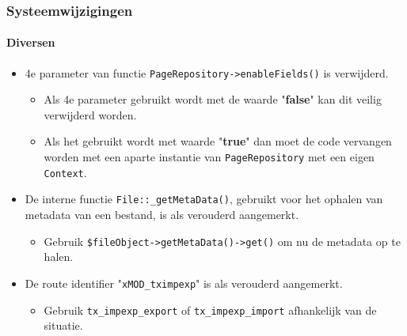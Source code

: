 
\begin{frame}[fragile]
	\frametitle{Systeemwijzigingen}
	\framesubtitle{Diversen}

	\begin{itemize}

		\item 4e parameter van functie \texttt{PageRepository->enableFields()} is verwijderd.

			\begin{itemize}\smaller
				\item[\ding{228}] Als 4e parameter gebruikt wordt met de waarde "\textbf{false}" kan dit veilig verwijderd worden.
				\item[\ding{228}] Als het gebruikt wordt met waarde "\textbf{true}" dan moet de code vervangen worden met een aparte instantie van \texttt{PageRepository} met een eigen \texttt{Context}.
			\end{itemize}\normalsize

		\item De interne functie \texttt{File::\_getMetaData()}, gebruikt voor het ophalen van metadata van een bestand,
			is als verouderd aangemerkt.

			\begin{itemize}\smaller
				\item[\ding{228}] Gebruik \texttt{\$fileObject->getMetaData()->get()} om nu de metadata op te halen.
			\end{itemize}\normalsize

		\item De route identifier "\texttt{xMOD\_tximpexp}" is als verouderd aangemerkt.

			\begin{itemize}\smaller
				\item[\ding{228}] Gebruik \texttt{tx\_impexp\_export} of \texttt{tx\_impexp\_import} afhankelijk van de situatie.
			\end{itemize}\normalsize

	\end{itemize}

\end{frame}


